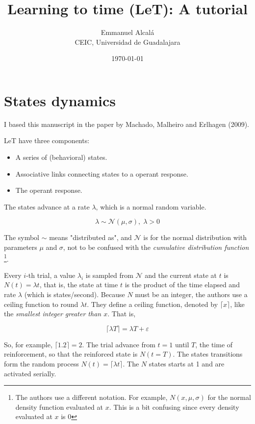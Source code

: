 \documentclass[11pt]{article}
\title{\color{tit} \textsf{\textbf{Learning to time (LeT): A tutorial}}}
\author{\normalsize Emmanuel Alcalá\\
        \normalsize CEIC, Universidad de Guadalajara}
\date{\today}
\begin{document}
    \maketitle

    \section{States dynamics}

I based this manuscript in the paper by Machado, Malheiro and Erlhagen (2009).

LeT have three components:

    \begin{itemize}
        \item A series of (behavioral) states.
        \item Associative links connecting states to a operant response.
        \item The operant response.
    \end{itemize}

The states advance at a rate $\lambda$, which is a normal random variable.

    \[
        \lambda \sim \mathcal{N} (\mu, \sigma),\; \lambda > 0
    \]

    The symbol $\sim$ means "distributed as", and $\mathcal{N}$ is for the normal distribution with parameters
    $\mu$ and $\sigma$, not to be confused with the \textit{cumulative distribution function} \footnote{The authors use a different notation. For example, $N(x,\mu,\sigma)$ for the normal density function evaluated at $x$. This is a bit confusing since every density evaluated at $x$ is 0}.

Every $i$-th trial, a value $\lambda_i$ is sampled from $\mathcal{N}$ and the current state at $t$ is $N(t) = \lambda t$, that is,
the state at time $t$ is the product of the time elapsed and rate $\lambda$ (which is states/second).
Because $N$ must be an integer, the authors use a ceiling function to round $\lambda t$.
They define a ceiling function, denoted by $\lceil x \rceil$, like the \textit{smallest integer greater than $x$}.
That is,

    \[
        \lceil \lambda T \rceil = \lambda T + \varepsilon
    \]

So, for example, $\lceil 1.2 \rceil = 2$. The trial advance from $t = 1$ until $T$, the time of reinforcement, so that the
reinforced state is $N(t = T)$.
    The states transitions form the random process $N(t) = \lceil {\lambda t} \rceil$.
    The $N$ states starts at 1 and are activated serially.
\end{document}
